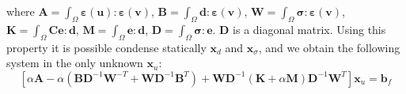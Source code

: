 \documentclass[preprint,12pt,authoryear]{elsarticle}
\begin{document}
where 
$\bm{A}=\int_{\Omega}\bm{\varepsilon}(\bm{u}):\bm{\varepsilon}(\bm{v})$, 
$\bm{B}=\int_{\Omega}\bm{d}:\bm{\varepsilon}(\bm{v})$, 
$\bm{W}=\int_{\Omega}\bm{\sigma}:\bm{\varepsilon}(\bm{v})$, 
$\bm{K}=\int_{\Omega}\bm{C}\bm{e}:\bm{d}$, 
$\bm{M}=\int_{\Omega}\bm{e}:\bm{d}$, 
$\bm{D}=\int_{\Omega}\bm{\sigma}:\bm{e}$.  
$\bm{D}$ is a diagonal matrix.
Using this property it is possible condense statically $\bm{x}_{d}$ and $\bm{x}_{\sigma}$, and we obtain the following system in the only unknown 
$\bm{x}_{u}$:
\begin{equation}
\left[ \alpha \bm{A} - \alpha \left( \bm{B} \bm{D}^{-1} \bm{W}^{-T} 
+ \bm{W} \bm{D}^{-1} \bm{B}^{T} \right) + 
\bm{W} \bm{D}^{-1} \left( \bm{K} + \alpha \bm{M} \right) 
\bm{D}^{-1} \bm{W}^{T} \right] \bm{x}_{u} = \bm{b}_{f}
\end{equation}
\end{document}
